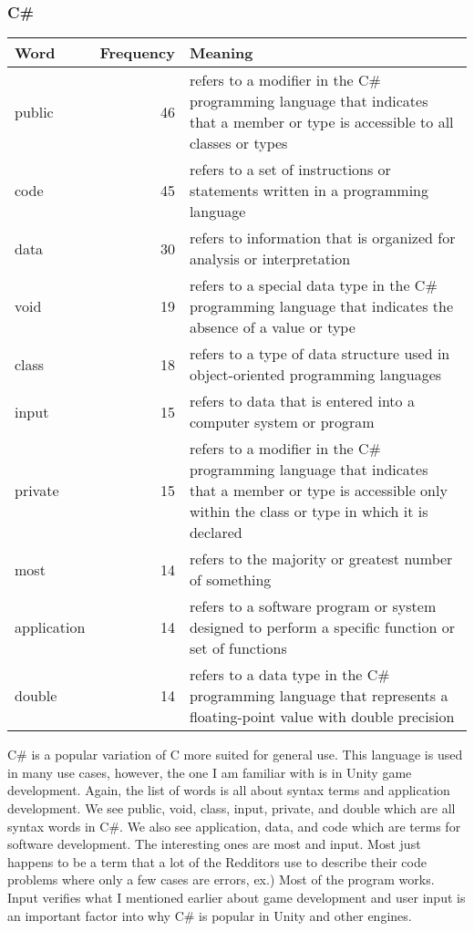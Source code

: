 \documentclass{article}
\theoremstyle{theorem}
\theoremstyle{definition}
\theoremstyle{remark}
\begin{document}
\subsubsection{C\#}
\begin{tabular}{ | l | r | p{7cm} | }
\hline
Word & Frequency & Meaning \\
\hline
public & 46 & refers to a modifier in the C\# programming language that indicates that a member or type is accessible to all classes or types \\
\hline
code & 45 & refers to a set of instructions or statements written in a programming language \\
\hline
data & 30 & refers to information that is organized for analysis or interpretation \\
\hline
void & 19 & refers to a special data type in the C# programming language that indicates the absence of a value or type \\
\hline
class & 18 & refers to a type of data structure used in object-oriented programming languages \\
\hline
input & 15 & refers to data that is entered into a computer system or program \\
\hline
private & 15 & refers to a modifier in the C# programming language that indicates that a member or type is accessible only within the class or type in which it is declared \\
\hline
most & 14 & refers to the majority or greatest number of something \\
\hline
application & 14 & refers to a software program or system designed to perform a specific function or set of functions \\
\hline
double & 14 & refers to a data type in the C# programming language that represents a floating-point value with double precision \\
\hline
\end{tabular}

\medskip
C\# is a popular variation of C more suited for general use. This language is used in many use cases, however, the one I am familiar with is in Unity game development. Again, the list of words is all about syntax terms and application development. We see public, void, class, input, private, and double which are all syntax words in C\#. We also see application, data, and code which are terms for software development. The interesting ones are most and input. Most just happens to be a term that a lot of the Redditors use to describe their code problems where only a few cases are errors, ex.) Most of the program works. Input verifies what I mentioned earlier about game development and user input is an important factor into why C\# is popular in Unity and other engines.
\end{document}
